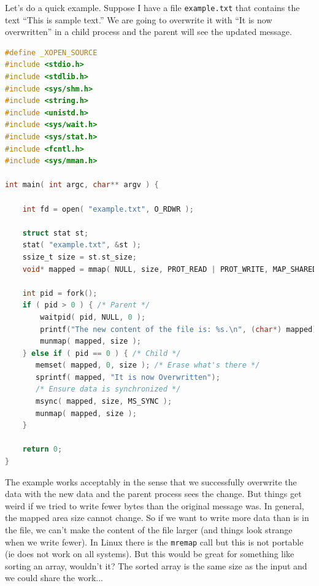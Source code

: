 Let's do a quick example. Suppose I have a file \texttt{example.txt} that contains the text ``This is sample text.'' We are going to overwrite it with ``It is now overwritten'' in a child process and the parent will see the updated message.

\begin{lstlisting}[language=C]
#define _XOPEN_SOURCE
#include <stdio.h>
#include <stdlib.h>
#include <sys/shm.h>
#include <string.h>
#include <unistd.h>
#include <sys/wait.h>
#include <sys/stat.h>
#include <fcntl.h>
#include <sys/mman.h>

int main( int argc, char** argv ) { 

    int fd = open( "example.txt", O_RDWR );
    
    struct stat st; 
    stat( "example.txt", &st );
    ssize_t size = st.st_size;
    void* mapped = mmap( NULL, size, PROT_READ | PROT_WRITE, MAP_SHARED, fd, 0 );  
    
    int pid = fork();
    if ( pid > 0 ) { /* Parent */
        waitpid( pid, NULL, 0 );
        printf("The new content of the file is: %s.\n", (char*) mapped);
        munmap( mapped, size );
    } else if ( pid == 0 ) { /* Child */
       memset( mapped, 0, size ); /* Erase what's there */
       sprintf( mapped, "It is now Overwritten");
       /* Ensure data is synchronized */
       msync( mapped, size, MS_SYNC );
       munmap( mapped, size );
    }

    return 0;
}
\end{lstlisting}

The example works acceptably in the sense that we successfully overwrite the data with the new data and the parent process sees the change. But things get weird if we tried to write fewer bytes than the original message was. In general, the mapped area size cannot change. So if we want to write more data than is in the file, we can't make the content of the file larger (and things look strange when we write fewer). In Linux there is the \texttt{mremap} call but this is not portable (ie does not work on all systems). But this would be great for something like sorting an array, wouldn't it? The sorted array is the same size as the input and we could share the work...



